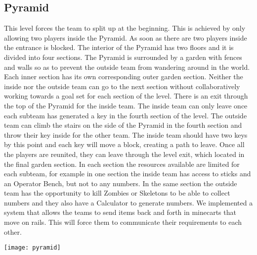 \subsection{Pyramid}
This level forces the team to split up at the beginning. This is achieved by only allowing two players inside the Pyramid. As soon as there are two players inside the entrance is blocked.\newline\newline
The interior of the Pyramid has two floors and it is divided into four sections. The Pyramid is surrounded by a garden with fences and walls so as to prevent the outside team from wandering around in the world. Each inner section has its own corresponding outer garden section. Neither the inside nor the outside team can go to the next section without collaboratively working towards a goal set for each section of the level.\newline\newline
There is an exit through the top of the Pyramid for the inside team. The inside team can only leave once each subteam has generated a key in the fourth section of the level. The outside team can climb the stairs on the side of the Pyramid in the fourth section and throw their key inside for the other team. The inside team should have two keys by this point and each key will move a block, creating a path to leave. Once all the players are reunited, they can leave through the level exit, which located in the final garden section.\newline\newline
In each section the resources available are limited for each subteam, for example in one section the inside team has access to sticks and an Operator Bench, but not to any numbers. In the same section the outside team has the opportunity to kill Zombies or Skeletons to be able to collect numbers and they also have a Calculator to generate numbers.\newline\newline
We implemented a system that allows the teams to send items back and forth in minecarts that move on rails. This will force them to communicate their requirements to each other.\newline

\texttt{[image: pyramid]}

